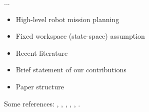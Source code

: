 ...

\begin{itemize}
	\item High-level robot mission planning
  	\item Fixed workspace (state-space) assumption
 	\item Recent literature
   	\item Brief statement of our contributions
   	\item Paper structure
\end{itemize}

Some references: \cite{MurrayICRA2012}, \cite{MurrayICRA2013a},  \cite{BeltaICRA2012}, \cite{Dimos2013ICRA}, \cite{Belta2013RSS}, \cite{BingxinRSS2012}.